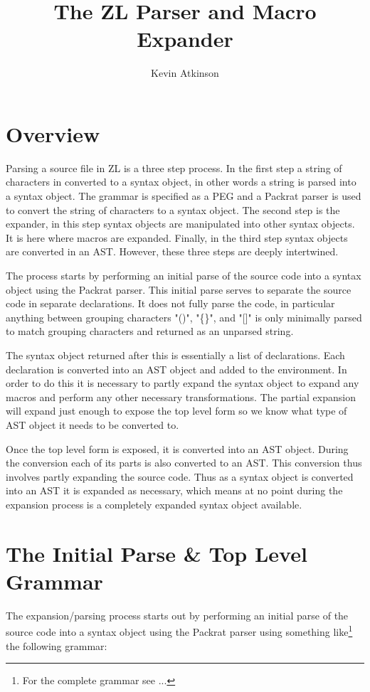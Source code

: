 \documentclass[12pt,english,letterpaper]{article}
\begin{document}
\title{The ZL Parser and Macro Expander}
\author{Kevin Atkinson}

\section{Overview}

Parsing a source file in ZL is a three step process.  In the first
step a string of characters in converted to a syntax object, in other
words a string is parsed into a syntax object.  The grammar is
specified as a PEG and a Packrat parser is used to convert the string of
characters to a syntax object.  The second step is the expander, in
this step syntax objects are manipulated into other syntax objects.
It is here where macros are expanded.  Finally, in the third step
syntax objects are converted in an AST.  However, these three steps
are deeply intertwined.

The process starts by performing an initial parse of the source code
into a syntax object using the Packrat parser.  This initial parse
serves to separate the source code in separate declarations.  It does
not fully parse the code, in particular anything between grouping
characters "()", "\{\}", and "[]" is only minimally parsed to match
grouping characters and returned as an unparsed string.

The syntax object returned after this is essentially a list of
declarations.  Each declaration is converted into an AST object and
added to the environment.  In order to do this it is necessary to partly
expand the syntax object to expand any macros and perform any other
necessary transformations.  The partial expansion will expand just
enough to expose the top level form so we know what type of AST object
it needs to be converted to.

Once the top level form is exposed, it is converted into an AST
object.  During the conversion each of its parts is also converted to
an AST.  This conversion thus involves partly expanding the source
code.  Thus as a syntax object is converted into an AST it is expanded
as necessary, which means at no point during the expansion process is
a completely expanded syntax object available.

\section{The Initial Parse \& Top Level Grammar}

The expansion/parsing process starts out by performing an initial
parse of the source code into a syntax object using the Packrat parser
using something like\footnote{For the complete grammar see ...} the
following grammar:
\end{document}
